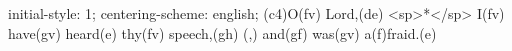 initial-style: 1;
centering-scheme: english;
(c4)O(fv) Lord,(de) <sp>*</sp> I(fv) have(gv) heard(e) thy(fv) speech,(gh) (,) and(gf) was(gv) a(f)fraid.(e)
